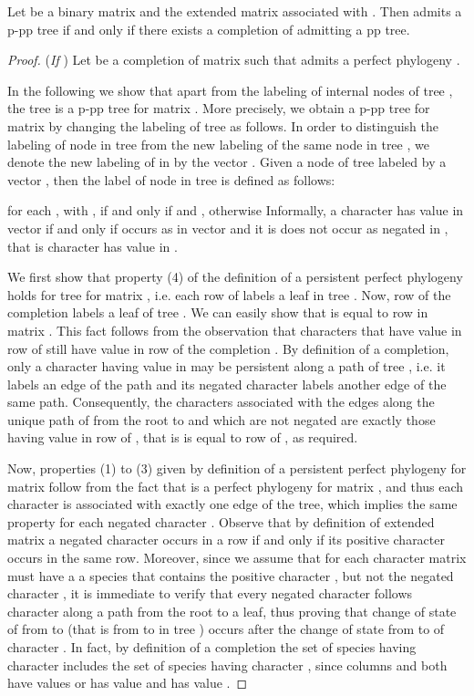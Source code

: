 \documentclass{llncs}
\begin{document}
\begin{theorem}
\label{equivalence}
Let   be a binary matrix and  the extended matrix   associated with . Then   admits a p-pp tree if and only if there
exists a  completion  of    admitting
a pp tree.
\end{theorem}
\begin{proof}
({\em If }) Let  be  a  completion of matrix  such that  admits a  perfect phylogeny  .


In the following we show that apart from the labeling of internal nodes of tree , the tree  is a p-pp  tree for matrix . More precisely, we obtain  a  p-pp tree  for matrix  by changing the labeling of tree  as follows. 
In order to distinguish the labeling of node  in tree  from the new labeling of the same node  in tree , we denote the new labeling of  in  by the vector .
Given 
a node  of tree  labeled by a  vector , then the label    of node  in tree   is defined as follows:

for each , with ,  if and only if  and , otherwise  
Informally, a character  has value  in vector  if and only if   occurs as   in vector  and it is does not occur as negated in , that is  character  has value  in .

We first show that property (4) of the definition of a persistent perfect phylogeny holds for tree  for matrix , i.e. each row  of  labels a leaf  in tree . Now, row  of the completion  labels a leaf   of tree .
We can easily show that  is equal to row  in matrix .   
This fact follows from the observation that characters that have value  in row  of  still have value  in row  of the completion . By definition of a completion, only   a character having value  in  may be persistent
along a path of tree , i.e. it labels  an  edge of the path and its negated character labels another edge of the same path.
Consequently, the characters associated with the edges along the unique path of  from the root to  and which are not negated are exactly those having value  in row  of , that is  is equal to row  of , as required.


Now,   properties (1) to (3)  given by definition of a persistent perfect phylogeny  for matrix  follow from the fact that  is a perfect phylogeny for matrix , and thus each character is associated with exactly one edge of the tree, which implies the same property for each negated character .  Observe that by  definition of extended matrix a negated character occurs in a row if and only if its positive character occurs in the same row.  Moreover, since we assume that  for each character  matrix  must have a a species that contains  the positive character , but not the negated character , 
 it is immediate to verify that every negated character  follows character  along a path from the root to a leaf, thus proving that change of state of  from  to  (that is from  to  in tree )  occurs after the change of state from  to  of character .  In fact, by definition of a completion the set of species  having character  includes the set of species having character , since columns  and  both have values  or  has value  and  has value .


\end{proof}
\end{document}
